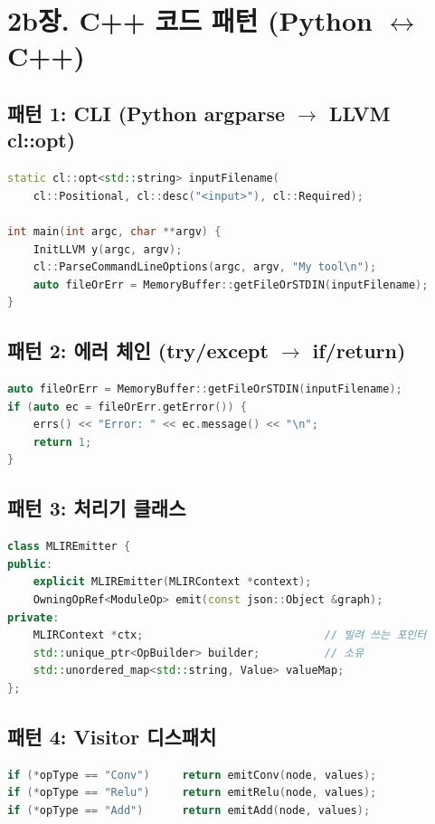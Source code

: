 \documentclass[11pt,a4paper]{article}
\begin{document}
\newpage

\section{2b장. C++ 코드 패턴 (Python $\leftrightarrow$ C++)}

\subsection{패턴 1: CLI (Python argparse $\to$ LLVM cl::opt)}
\begin{lstlisting}[language=C++]
static cl::opt<std::string> inputFilename(
    cl::Positional, cl::desc("<input>"), cl::Required);

int main(int argc, char **argv) {
    InitLLVM y(argc, argv);
    cl::ParseCommandLineOptions(argc, argv, "My tool\n");
    auto fileOrErr = MemoryBuffer::getFileOrSTDIN(inputFilename);
}
\end{lstlisting}

\subsection{패턴 2: 에러 체인 (try/except $\to$ if/return)}
\begin{lstlisting}[language=C++]
auto fileOrErr = MemoryBuffer::getFileOrSTDIN(inputFilename);
if (auto ec = fileOrErr.getError()) {
    errs() << "Error: " << ec.message() << "\n";
    return 1;
}
\end{lstlisting}

\subsection{패턴 3: 처리기 클래스}
\begin{lstlisting}[language=C++]
class MLIREmitter {
public:
    explicit MLIREmitter(MLIRContext *context);
    OwningOpRef<ModuleOp> emit(const json::Object &graph);
private:
    MLIRContext *ctx;                            // 빌려 쓰는 포인터
    std::unique_ptr<OpBuilder> builder;          // 소유
    std::unordered_map<std::string, Value> valueMap;
};
\end{lstlisting}

\subsection{패턴 4: Visitor 디스패치}
\begin{lstlisting}[language=C++]
if (*opType == "Conv")     return emitConv(node, values);
if (*opType == "Relu")     return emitRelu(node, values);
if (*opType == "Add")      return emitAdd(node, values);
\end{lstlisting}
\end{document}

